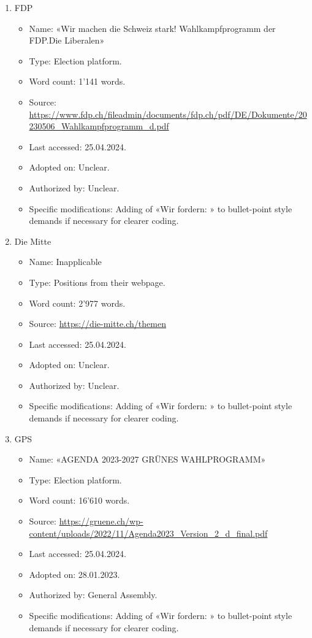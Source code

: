 \documentclass[11pt,a4paper]{article}
\begin{document}
\begin{enumerate}
\newpage
\item FDP
    \begin{itemize}
        \item Name: «Wir machen die Schweiz stark! Wahlkampfprogramm der FDP.Die Liberalen»
        \item Type: Election platform.
        \item Word count: 1'141 words.
        \item Source: \url{https://www.fdp.ch/fileadmin/documents/fdp.ch/pdf/DE/Dokumente/20230506_Wahlkampfprogramm_d.pdf}
        \item Last accessed: 25.04.2024.
        \item Adopted on: Unclear.
        \item Authorized by: Unclear.
        \item Specific modifications: Adding of «Wir fordern: » to bullet-point style demands if necessary for clearer coding.
    \end{itemize}

\item Die Mitte
    \begin{itemize}
        \item Name: Inapplicable
        \item Type: Positions from their webpage.
        \item Word count: 2’977 words.
        \item Source: \url{https://die-mitte.ch/themen}
        \item Last accessed: 25.04.2024.
        \item Adopted on: Unclear.
        \item Authorized by: Unclear.
        \item Specific modifications: Adding of «Wir fordern: » to bullet-point style demands if necessary for clearer coding.
    \end{itemize}

\newpage
\item GPS
    \begin{itemize}
        \item Name: «AGENDA 2023-2027 GRÜNES WAHLPROGRAMM»
        \item Type: Election platform.
        \item Word count: 16’610 words.
        \item Source: \url{https://gruene.ch/wp-content/uploads/2022/11/Agenda2023_Version_2_d_final.pdf}
        \item Last accessed: 25.04.2024.
        \item Adopted on: 28.01.2023.
        \item Authorized by: General Assembly.
        \item Specific modifications: Adding of «Wir fordern: » to bullet-point style demands if necessary for clearer coding.
    \end{itemize}


\end{enumerate}
\end{document}
